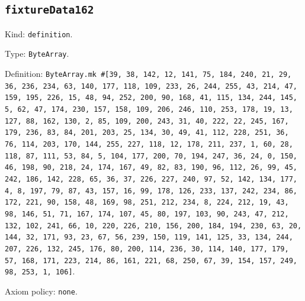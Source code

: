 \documentclass[11pt]{article}
\begin{document}
\subsection*{\texttt{fixtureData162}}
\noindent Kind: \texttt{definition}.\par
\noindent Type: \texttt{ByteArray}.\par
\noindent Definition: \texttt{ByteArray.mk \#[39, 38, 142, 12, 141, 75, 184, 240, 21, 29, 36, 236, 234, 63, 140, 177, 118, 109, 233, 26, 244, 255, 43, 214, 47, 159, 195, 226, 15, 48, 94, 252, 200, 90, 168, 41, 115, 134, 244, 145, 5, 62, 47, 174, 230, 157, 158, 109, 206, 246, 110, 253, 178, 19, 13, 127, 88, 162, 130, 2, 85, 109, 200, 243, 31, 40, 222, 22, 245, 167, 179, 236, 83, 84, 201, 203, 25, 134, 30, 49, 41, 112, 228, 251, 36, 76, 114, 203, 170, 144, 255, 227, 118, 12, 178, 211, 237, 1, 60, 28, 118, 87, 111, 53, 84, 5, 104, 177, 200, 70, 194, 247, 36, 24, 0, 150, 46, 198, 90, 218, 24, 174, 167, 49, 82, 83, 190, 96, 112, 26, 99, 45, 242, 186, 142, 228, 65, 36, 37, 226, 227, 240, 97, 52, 142, 134, 177, 4, 8, 197, 79, 87, 43, 157, 16, 99, 178, 126, 233, 137, 242, 234, 86, 172, 221, 90, 158, 48, 169, 98, 251, 212, 234, 8, 224, 212, 19, 43, 98, 146, 51, 71, 167, 174, 107, 45, 80, 197, 103, 90, 243, 47, 212, 132, 102, 241, 66, 10, 220, 226, 210, 156, 200, 184, 194, 230, 63, 20, 144, 32, 171, 93, 23, 67, 56, 239, 150, 119, 141, 125, 33, 134, 244, 207, 226, 132, 245, 176, 80, 200, 114, 236, 30, 114, 140, 177, 179, 57, 168, 171, 223, 214, 86, 161, 221, 68, 250, 67, 39, 154, 157, 249, 98, 253, 1, 106]}.\par
\noindent Axiom policy: \texttt{none}.\par
\end{document}
